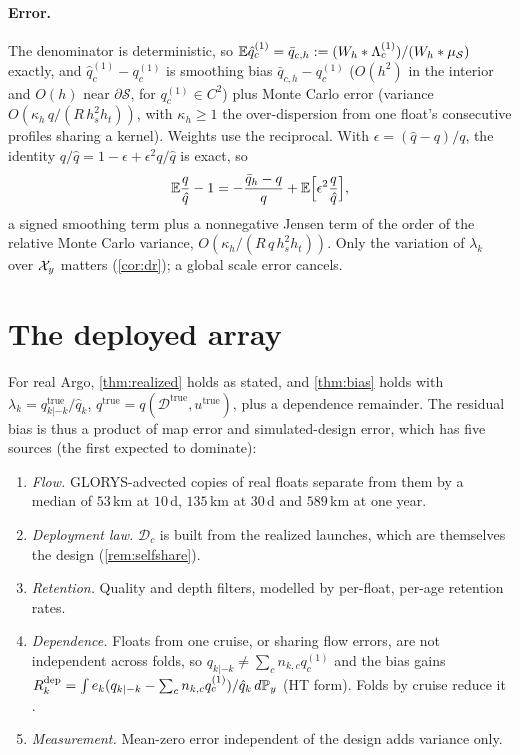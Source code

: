 \paragraph{Error.} The denominator is deterministic, so $\mathbb{E}\hat q^{(1)}_c=\bar q_{c,h}:=(W_h*\Lambda^{(1)}_c)/(W_h*\mu_{\mathcal S})$
exactly, and $\hat q^{(1)}_c-q^{(1)}_c$ is smoothing bias $\bar q_{c,h}-q^{(1)}_c$ ($O(h^2)$ in the
interior and $O(h)$ near $\partial\mathcal S$, for $q^{(1)}_c\in C^2$) plus Monte Carlo error (variance
$O(\kappa_h\,q/(R\,h_s^2h_t))$, with $\kappa_h\ge1$ the over-dispersion from one float's consecutive
profiles sharing a kernel). Weights use the reciprocal. With $\epsilon=(\hat q-q)/q$, the identity
$q/\hat q=1-\epsilon+\epsilon^2q/\hat q$ is exact, so
\[
  \mathbb{E}\frac{q}{\hat q}-1=-\frac{\bar q_h-q}{q}+\mathbb{E}\Big[\epsilon^2\frac{q}{\hat q}\Big],
\]
a signed smoothing term plus a nonnegative Jensen term of the order of the relative Monte Carlo
variance, $O(\kappa_h/(R\,q\,h_s^2h_t))$. Only the variation
of $\lambda_k$ over $\mathcal{X}_y$ matters (\cref{cor:dr}); a global scale error cancels.

\section{The deployed array}\label{sec:real}

For real Argo, \cref{thm:realized} holds as stated, and \cref{thm:bias} holds with
$\lambda_k=q^{\mathrm{true}}_{k|-k}/\hat q_k$, $q^{\mathrm{true}}=q(\mathcal D^{\mathrm{true}},u^{\mathrm{true}})$,
plus a dependence remainder. The residual bias is thus a product of map error and simulated-design
error, which has five sources (the first expected to dominate):
\begin{enumerate}
  \item \emph{Flow.} GLORYS-advected copies of real floats separate from them by a median of $53$\,km at
        $10$\,d, $135$\,km at $30$\,d and $589$\,km at one year.
  \item \emph{Deployment law.} $\mathcal D_c$ is built from the realized launches, which are themselves
        the design (\cref{rem:selfshare}).
  \item \emph{Retention.} Quality and depth filters, modelled by per-float, per-age retention rates.
  \item \emph{Dependence.} Floats from one cruise, or sharing flow errors, are not independent across
        folds, so $q_{k|-k}\neq\sum_cn_{k,c}q^{(1)}_c$ and the bias gains
        $R^{\mathrm{dep}}_k=\int e_k(q_{k|-k}-\sum_cn_{k,c}q^{(1)}_c)/\hat q_k\,d\mathbb{P}_y$ (HT form).
        Folds by cruise reduce it \citep{chiang2022}.
  \item \emph{Measurement.} Mean-zero error independent of the design adds variance only.
\end{enumerate}

